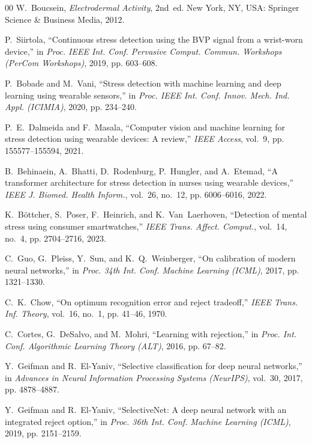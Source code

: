 \documentclass[conference]{IEEEtran}
\begin{document}
\begin{thebibliography}{00}
W.~Boucsein, \textit{Electrodermal Activity}, 2nd~ed. New York, NY, USA: Springer Science \& Business Media, 2012.

P.~Siirtola, ``Continuous stress detection using the BVP signal from a wrist-worn device,'' in \textit{Proc. IEEE Int. Conf. Pervasive Comput. Commun. Workshops (PerCom Workshops)}, 2019, pp. 603--608.

P.~Bobade and M.~Vani, ``Stress detection with machine learning and deep learning using wearable sensors,'' in \textit{Proc. IEEE Int. Conf. Innov. Mech. Ind. Appl. (ICIMIA)}, 2020, pp. 234--240.

P.~E.~Dalmeida and F.~Masala, ``Computer vision and machine learning for stress detection using wearable devices: A review,'' \textit{IEEE Access}, vol.~9, pp. 155577--155594, 2021.

B.~Behinaein, A.~Bhatti, D.~Rodenburg, P.~Hungler, and A.~Etemad, ``A transformer architecture for stress detection in nurses using wearable devices,'' \textit{IEEE J. Biomed. Health Inform.}, vol.~26, no.~12, pp. 6006--6016, 2022.

K.~B\"ottcher, S.~Poser, F.~Heinrich, and K.~Van~Laerhoven, ``Detection of mental stress using consumer smartwatches,'' \textit{IEEE Trans. Affect. Comput.}, vol.~14, no.~4, pp. 2704--2716, 2023.

C.~Guo, G.~Pleiss, Y.~Sun, and K.~Q.~Weinberger, ``On calibration of modern neural networks,'' in \textit{Proc. 34th Int. Conf. Machine Learning (ICML)}, 2017, pp. 1321--1330.

C.~K.~Chow, ``On optimum recognition error and reject tradeoff,'' \textit{IEEE Trans. Inf. Theory}, vol.~16, no.~1, pp. 41--46, 1970.

C.~Cortes, G.~DeSalvo, and M.~Mohri, ``Learning with rejection,'' in \textit{Proc. Int. Conf. Algorithmic Learning Theory (ALT)}, 2016, pp. 67--82.

Y.~Geifman and R.~El-Yaniv, ``Selective classification for deep neural networks,'' in \textit{Advances in Neural Information Processing Systems (NeurIPS)}, vol.~30, 2017, pp. 4878--4887.

Y.~Geifman and R.~El-Yaniv, ``SelectiveNet: A deep neural network with an integrated reject option,'' in \textit{Proc. 36th Int. Conf. Machine Learning (ICML)}, 2019, pp. 2151--2159.


\end{thebibliography}
\end{document}

